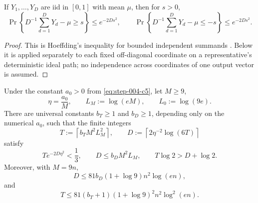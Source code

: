 \begin{lemma}
\label{lem:hoeffding-search}
If $Y_1,\ldots,Y_D$ are iid in $[0,1]$ with mean $\mu$, then for $s>0$,
\[
\Pr\left\{D^{-1}\sum_{d=1}^D Y_d-\mu\geq s\right\}
\leq e^{-2Ds^2},\qquad
\Pr\left\{D^{-1}\sum_{d=1}^D Y_d-\mu\leq-s\right\}
\leq e^{-2Ds^2}.
\tag{C11}\label{eq:step-004-c11}
\]
\end{lemma}
\begin{proof}
This is Hoeffding's inequality for bounded independent summands
\citep{hoeffding1963}.  Below it is applied separately to each fixed
off-diagonal coordinate on a representative's deterministic ideal path;
no independence across coordinates of one output vector is assumed.
\end{proof}



\begin{lemma}
\label{lem:step-004-quantitative-choice}

Under the constant \(a_0>0\) from \eqref{eq:step-004-c5}, let \(M\ge 9\),
\[
\eta=\frac{a_0}{M},
\qquad
L_M:=\log(eM),
\qquad
L_0:=\log(9e).
\tag{1}\label{eq:step-004-1}
\]
There are universal constants \(b_T\ge 1\) and \(b_D\ge 1\), depending only on the numerical \(a_0\), such that the finite integers
\[
T:=\left\lceil b_TM^2L_M^2\right\rceil,
\qquad
D:=\left\lceil2\eta^{-2}\log(6T)\right\rceil
\tag{2}\label{eq:step-004-2}
\]
satisfy
\[
T e^{-2D\eta^2}<\frac13,
\qquad
D\le b_DM^2L_M,
\qquad
T\log2>D+\log2.
\tag{3}\label{eq:step-004-3}
\]
Moreover, with \(M=9n\),
\[
D\le81b_D(1+\log9)n^2\log(en),
\tag{4}\label{eq:step-004-4}
\]
and
\[
T\le81(b_T+1)(1+\log9)^2n^2\log^2(en).
\tag{5}\label{eq:step-004-5}
\]

\end{lemma}

